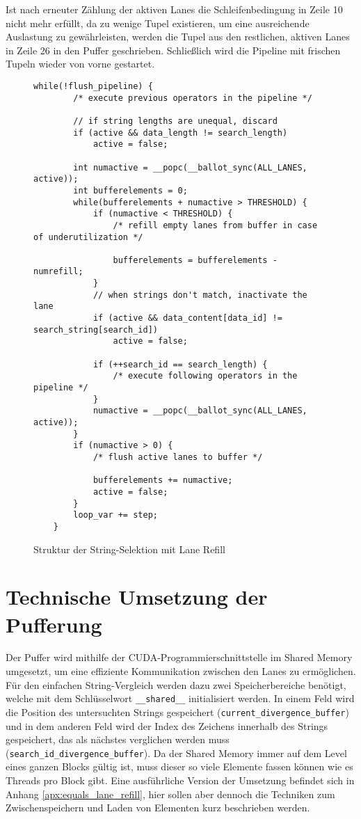 Ist nach erneuter Zählung der aktiven Lanes die Schleifenbedingung in Zeile 10 nicht mehr erfüllt, da zu wenige Tupel existieren, um eine ausreichende Auslastung zu gewährleisten, werden die Tupel aus den restlichen, aktiven Lanes in Zeile 26 in den Puffer geschrieben.
Schließlich wird die Pipeline mit frischen Tupeln wieder von vorne gestartet.

\newpage

\begin{figure}[]
	\begin{lstlisting}[language=MyC++]
	while(!flush_pipeline) {
		/* execute previous operators in the pipeline */
		
		// if string lengths are unequal, discard
		if (active && data_length != search_length)
			active = false;
		
		int numactive = __popc(__ballot_sync(ALL_LANES, active));
		int bufferelements = 0;
		while(bufferelements + numactive > THRESHOLD) {
			if (numactive < THRESHOLD) {
				/* refill empty lanes from buffer in case of underutilization */
				
				bufferelements = bufferelements - numrefill;
			}
			// when strings don't match, inactivate the lane
			if (active && data_content[data_id] != search_string[search_id])
				active = false;
			
			if (++search_id == search_length) {
				/* execute following operators in the pipeline */
			}
			numactive = __popc(__ballot_sync(ALL_LANES, active));
		}
		if (numactive > 0) {
			/* flush active lanes to buffer */
			
			bufferelements += numactive;
			active = false;
		}
		loop_var += step;
	}
	\end{lstlisting}
	\caption{Struktur der String-Selektion mit Lane Refill}
	\label{equals_lane_refill_code}
\end{figure}

\section{Technische Umsetzung der Pufferung}
\label{sec:equals_lane_refill_pufferung}

Der Puffer wird mithilfe der CUDA-Programmierschnittstelle im Shared Memory umgesetzt, um eine effiziente Kommunikation zwischen den Lanes zu ermöglichen.
Für den einfachen String-Vergleich werden dazu zwei Speicherbereiche benötigt, welche mit dem Schlüsselwort \texttt{\_\_shared\_\_} initialisiert werden.
In einem Feld wird die Position des untersuchten Strings gespeichert (\texttt{current\_divergence\_buffer}) und in dem anderen Feld wird der Index des Zeichens innerhalb des Strings gespeichert, das als nächstes verglichen werden muss (\texttt{search\_id\_divergence\_buffer}).
Da der Shared Memory immer auf dem Level eines ganzen Blocks gültig ist, muss dieser so viele Elemente fassen können wie es Threads pro Block gibt.
Eine ausführliche Version der Umsetzung befindet sich in Anhang \ref{apx:equals_lane_refill}, hier sollen aber dennoch die Techniken zum Zwischenspeichern und Laden von Elementen kurz beschrieben werden.


